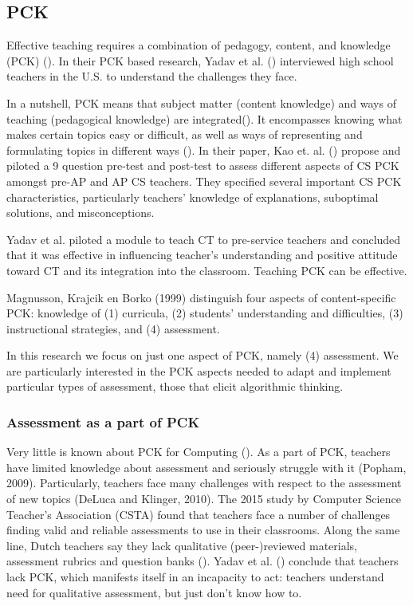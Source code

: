 \subsection*{PCK}

Effective teaching requires a combination of pedagogy, content, and knowledge (PCK) (\cite{shulman1986pedagogical}). In their PCK based research, Yadav et al. (\cite{Yadav2016}) interviewed high school teachers in the U.S. to understand the challenges they face.

In a nutshell, PCK means that subject matter (content knowledge) and ways of teaching (pedagogical knowledge) are integrated(\cite{Yadav2016}). It encompasses knowing what makes certain topics easy or difficult, as well as ways of representing and formulating topics in different ways (\cite{shulman1986pedagogical}). In their paper, Kao et. al. (\cite{Kao2018}) propose and piloted a 9 question pre-test and post-test to assess different aspects of CS PCK amongst pre-AP and AP CS teachers. They specified several important CS PCK characteristics, particularly teachers' knowledge of explanations, suboptimal solutions, and misconceptions.

Yadav et al. \cite{yadav2014computational} piloted a module to teach CT to pre-service teachers and concluded that it was effective in influencing teacher's understanding and positive attitude toward CT and its integration into the classroom. Teaching PCK can be effective.





Magnusson, Krajcik en Borko (1999) distinguish four aspects of content-specific PCK: knowledge of
(1) curricula, (2) students' understanding and difficulties, (3) instructional strategies, and (4) assessment.


In this research we focus on just one aspect of PCK, namely (4) assessment. We are particularly interested in the PCK aspects needed to adapt and implement particular types of assessment, those that elicit algorithmic thinking.


\subsubsection*{Assessment as a part of PCK}
Very little is known about PCK for Computing (\cite{Yadav2016}). As a part of PCK, teachers have limited knowledge about assessment and seriously struggle with it (Popham, 2009). Particularly, teachers face many challenges with respect to the assessment of new topics (DeLuca and Klinger, 2010). The 2015 study by Computer Science Teacher's Association (CSTA) found that teachers face a number of challenges finding valid and reliable assessments to use in their classrooms. Along the same line, Dutch teachers say they lack qualitative (peer-)reviewed materials, assessment rubrics and question banks (\cite{tolboom2014informatica}). Yadav et al. (\cite{Yadav2015}) conclude that teachers lack PCK, which manifests itself in an incapacity to act: teachers understand need for qualitative assessment, but just don't know how to.

